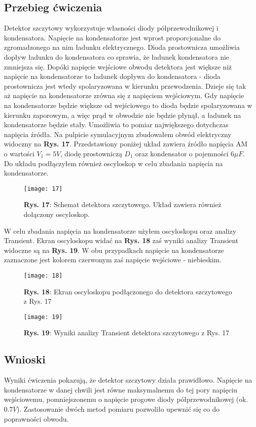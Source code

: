 \documentclass[11pt]{article}
\begin{document}
\subsection{Przebieg ćwiczenia}
Detektor szczytowy wykorzystuje własności diody półprzewodnikowej i kondensatora. Napięcie na kondensatorze jest wprost proporcjonalne do zgromadzonego na nim ładunku elektrycznego. Dioda prostownicza umożliwia dopływ ładunku do kondensatora co sprawia, że ładunek kondensatora nie zmniejsza się.
Dopóki napięcie wejściowe obwodu detektora jest większe niż napięcie na kondensatorze to ładunek dopływa do kondensatora - dioda prostownicza jest wtedy spolaryzowana w kierunku przewodzenia. Dzieje się tak aż napięcie na kondensatorze zrówna się z napięciem wejściowym. Gdy napięcie na kondensatorze będzie
większe od wejściowego to dioda będzie spolaryzowana w kierunku zaporowym, a więc prąd w obwodzie nie będzie płynął, a ładunek na kondensatorze będzie stały. Umożliwia to pomiar największego dotychczas napięcia źródła. \newline
Na pulpicie symulacyjnym zbudowałem obwód elektryczny widoczny na \textbf{Rys. 17}. Przedstawiony poniżej układ zawiera źródło napięcia AM o wartości $V_1 = 5V$, diodę prostowniczą $D_1$ oraz kondensator o pojemności $6\mu$$F$. Do układu podłączyłem również oscyloskop w celu zbadania napięcia na kondensatorze.
\begin{figure}[H]
\centering
\texttt{[image: 17]}
\caption*{\textbf{Rys. 17}: Schemat detektora szczytowego. Układ zawiera również dołączony oscyloskop.}
\end{figure}
\noindent W celu zbadania napięcia na kondensatorze użyłem oscyloskopu oraz analizy Transient. Ekran oscyloskopu widać na \textbf{Rys. 18} zaś wyniki analizy Transient widoczne są na \textbf{Rys. 19}. W obu przypadkach napięcie na kondensatorze zaznaczone jest kolorem czerwonym zaś napięcie wejściowe - niebieskim.
\begin{figure}[H]
\centering
\texttt{[image: 18]}
\caption*{\textbf{Rys. 18}: Ekran oscyloskopu podłączonego do detektora szczytowego z Rys. 17}
\end{figure}
\begin{figure}[H]
\centering
\texttt{[image: 19]}
\caption*{\textbf{Rys. 19}: Wyniki analizy Transient detektora szczytowego z  Rys. 17}
\end{figure}
\subsection{Wnioski}
Wyniki ćwiczenia pokazują, że detektor szczytowy działa prawidłowo. Napięcie na kondensatorze w danej chwili jest równe maksymalnemu do tej pory napięciu wejściowemu, pomniejszonemu o napięcie progowe diody półprzewodnikowej (ok. $0.7 V$). Zastosowanie dwóch metod pomiaru pozwoliło upewnić się co do 
poprawności obwodu.
\end{document}
